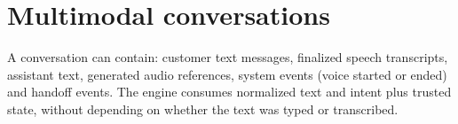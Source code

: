 
\section{Multimodal conversations}
A conversation can contain: customer text messages, finalized speech transcripts, assistant text, generated audio references, system events (voice started or ended) and handoff events. The engine consumes normalized text and intent plus trusted state, without depending on whether the text was typed or transcribed.

